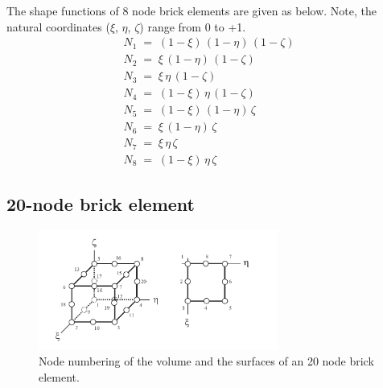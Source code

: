 \documentclass{article}
\begin{document}
The shape functions of 8 node brick elements are given as below. Note, the natural coordinates ($\xi$, $\eta$, $\zeta$) range from 0 to +1.  
\begin{eqnarray}
N_1 \;=\; (1-\xi)\, (1-\eta)\, (1-\zeta) \\
N_2 \;=\; \xi\, (1-\eta)\, (1-\zeta) \\
N_3 \;=\; \xi\, \eta\, (1-\zeta) \\
N_4 \;=\; (1-\xi)\, \eta\, (1-\zeta) \\
N_5 \;=\; (1-\xi)\, (1-\eta)\, \zeta \\
N_6 \;=\; \xi\, (1-\eta)\, \zeta \\
N_7 \;=\; \xi\, \eta\, \zeta \\
N_8 \;=\; (1-\xi)\, \eta\, \zeta
\end{eqnarray}


 


\subsection{20-node brick element}

\begin{figure}
    \centering
            \includegraphics[width=0.7\textwidth]{20nodebrick.pdf}
    \caption{Node numbering of the volume and the surfaces of an 20 node brick element.}
    \label{fig2}
\end{figure}
\end{document}
